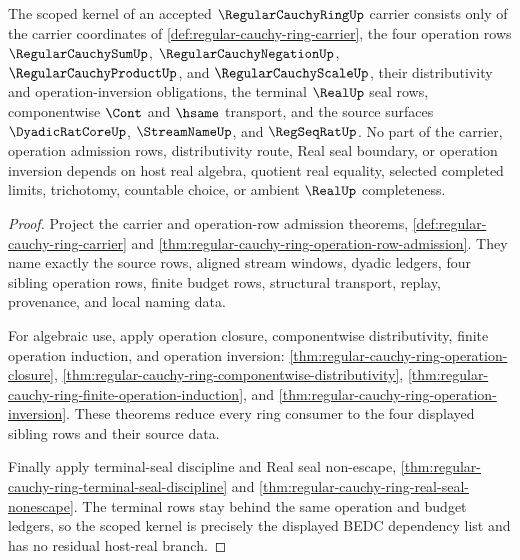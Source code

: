 \begin{theorem}
\label{thm:regular-cauchy-ring-scoped-kernel-dependency}
The scoped kernel of an accepted $\RegularCauchyRingUp$ carrier consists only of the carrier coordinates of \autoref{def:regular-cauchy-ring-carrier}, the four operation rows $\RegularCauchySumUp$, $\RegularCauchyNegationUp$, $\RegularCauchyProductUp$, and $\RegularCauchyScaleUp$, their distributivity and operation-inversion obligations, the terminal $\RealUp$ seal rows, componentwise $\Cont$ and $\hsame$ transport, and the source surfaces $\DyadicRatCoreUp$, $\StreamNameUp$, and $\RegSeqRatUp$. No part of the carrier, operation admission rows, distributivity route, Real seal boundary, or operation inversion depends on host real algebra, quotient real equality, selected completed limits, trichotomy, countable choice, or ambient $\RealUp$ completeness.
\end{theorem}
\begin{proof}
Project the carrier and operation-row admission theorems, \autoref{def:regular-cauchy-ring-carrier} and \autoref{thm:regular-cauchy-ring-operation-row-admission}. They name exactly the source rows, aligned stream windows, dyadic ledgers, four sibling operation rows, finite budget rows, structural transport, replay, provenance, and local naming data.

For algebraic use, apply operation closure, componentwise distributivity, finite operation induction, and operation inversion: \autoref{thm:regular-cauchy-ring-operation-closure}, \autoref{thm:regular-cauchy-ring-componentwise-distributivity}, \autoref{thm:regular-cauchy-ring-finite-operation-induction}, and \autoref{thm:regular-cauchy-ring-operation-inversion}. These theorems reduce every ring consumer to the four displayed sibling rows and their source data.

Finally apply terminal-seal discipline and Real seal non-escape, \autoref{thm:regular-cauchy-ring-terminal-seal-discipline} and \autoref{thm:regular-cauchy-ring-real-seal-nonescape}. The terminal rows stay behind the same operation and budget ledgers, so the scoped kernel is precisely the displayed BEDC dependency list and has no residual host-real branch.
\end{proof}


